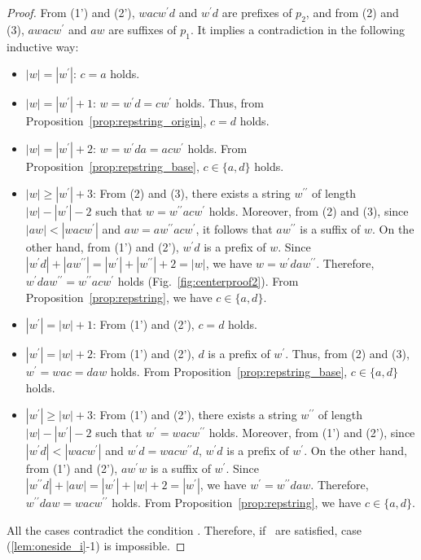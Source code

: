 \begin{proof}
From (1') and (2'), $wacw^{\prime}d$ and $w^{\prime}d$ are prefixes of $p_{2}$, and from (2) and (3), $awacw^{\prime}$ and $aw$ are suffixes of $p_{1}$.
It implies a contradiction in the following inductive way:

  \begin{itemize}
  \item $|w|=|w^{\prime}|$: $c = a$ holds.
  \item $|w|=|w^{\prime}|+1$: $w = w^{\prime}d = cw^{\prime}$ holds. Thus, from Proposition~\ref{prop:repstring_origin}, $c = d$ holds.
  \item $|w| = |w^{\prime}|+2$: $w = w^{\prime}da = acw^{\prime}$ holds. From Proposition~\ref{prop:repstring_base},  $c \in \{a, d\}$ holds.
  \item $|w| \ge |w^{\prime}|+3$: From (2) and (3), there exists a string $w^{\prime\prime}$ of length $|w|-|w^{\prime}|-2$ such that $w=w^{\prime\prime}acw^{\prime}$ holds.
  Moreover, from (2) and (3), since $|aw| < |wacw^{\prime}|$ and $aw = aw^{\prime\prime}acw^{\prime}$, it follows that $aw^{\prime\prime}$ is a suffix of $w$.
  On the other hand, from (1') and (2'), $w^{\prime}d$ is a prefix of $w$.
  Since $|w^{\prime}d| + |aw^{\prime\prime}| = |w^{\prime}| + |w^{\prime\prime}| + 2 = |w|$, we have $w=w^{\prime}daw^{\prime\prime}$.
  Therefore, $w^{\prime}daw^{\prime\prime} = w^{\prime\prime}acw^{\prime}$ holds (Fig.~\ref{fig:centerproof2}).
  From Proposition~\ref{prop:repstring}, we have $c \in \{a, d\}$.
  \item $|w^{\prime}|=|w|+1$: From (1') and (2'), $c = d$ holds.
  \item $|w^{\prime}| = |w|+2$: From (1') and (2'), $d$ is a prefix of $w^{\prime}$. Thus, from (2) and (3), $w^{\prime} = wac = daw$ holds. From Proposition~\ref{prop:repstring_base}, $c \in \{a, d\}$ holds.
 \item $|w^{\prime}| \ge |w|+3$: From (1') and (2'), there exists a string $w^{\prime\prime}$ of length $|w|-|w^{\prime}|-2$ such that $w^{\prime}=wacw^{\prime\prime}$ holds.
  Moreover, from (1') and (2'), since $|w^{\prime}d| < |wacw^{\prime}|$ and $w^{\prime}d = wacw^{\prime\prime}d$, $w^{\prime}d$ is a prefix of $w^{\prime}$.
  On the other hand, from (1') and (2'), $aw^{\prime}w$ is a suffix of $w^{\prime}$.
  Since $|w^{\prime\prime}d| + |aw| = |w^{\prime}| + |w| + 2 = |w^{\prime}|$, we have $w^{\prime}=w^{\prime\prime}daw$.
  Therefore, $w^{\prime\prime}daw = wacw^{\prime\prime}$ holds.
  From Proposition~\ref{prop:repstring}, we have $c \in \{a, d\}$.
  \end{itemize}
  All the cases contradict the condition \TheConditionBsub.
  Therefore, if \TheConditionB\ are satisfied, case (\ref{lem:oneside_i}-1) is impossible.


\end{proof}
